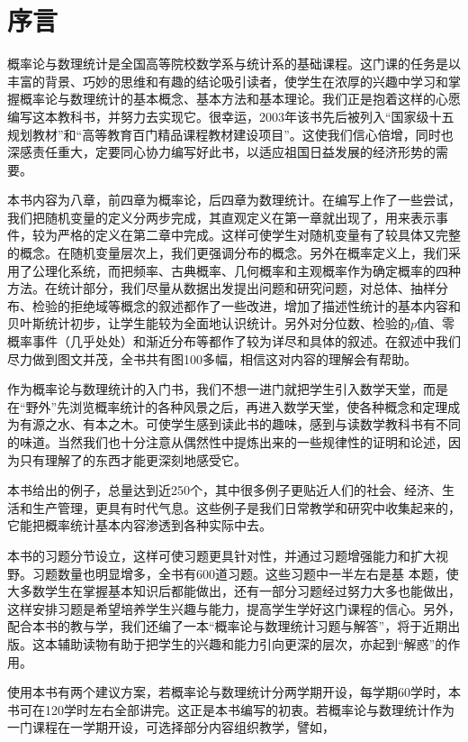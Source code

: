 
\chapter*{序\quad 言}
概率论与数理统计是全国高等院校数学系与统计系的基础课程。这门课的任务是以丰富的背景、巧妙的思维和有趣的结论吸引读者，使学生在浓厚的兴趣中学习和掌握概率论与数理统计的基本概念、基本方法和基本理论。我们正是抱着这样的心愿编写这本教科书，并努力去实现它。很幸运，2003年该书先后被列入“国家级十五规划教材”和“高等教育百门精品课程教材建设项目”。这使我们信心倍增，同时也深感责任重大，定要同心协力编写好此书，以适应祖国日益发展的经济形势的需要。

本书内容为八章，前四章为概率论，后四章为数理统计。在编写上作了一些尝试，我们把随机变量的定义分两步完成，其直观定义在第一章就出现了，用来表示事件，较为严格的定义在第二章中完成。这样可使学生对随机变量有了较具体又完整的概念。在随机变量层次上，我们更强调分布的概念。另外在概率定义上，我们采用了公理化系统，而把频率、古典概率、几何概率和主观概率作为确定概率的四种方法。在统计部分，我们尽量从数据出发提出问题和研究问题，对总体、抽样分布、检验的拒绝域等概念的叙述都作了一些改进，增加了描述性统计的基本内容和贝叶斯统计初步，让学生能较为全面地认识统计。另外对分位数、检验的$p$值、零概率事件（几乎处处）和渐近分布等都作了较为详尽和具体的叙述。在叙述中我们尽力做到图文并茂，全书共有图100多幅，相信这对内容的理解会有帮助。

作为概率论与数理统计的入门书，我们不想一进门就把学生引入数学天堂，而是在“野外”先浏览概率统计的各种风景之后，再进入数学天堂，使各种概念和定理成为有源之水、有本之木。可使学生感到读此书的趣味，感到与读数学教科书有不同的味道。当然我们也十分注意从偶然性中提炼出来的一些规律性的证明和论述，因为只有理解了的东西才能更深刻地感受它。

本书给出的例子，总量达到近250个，其中很多例子更贴近人们的社会、经济、生活和生产管理，更具有时代气息。这些例子是我们日常教学和研究中收集起来的，它能把概率统计基本内容渗透到各种实际中去。

本书的习题分节设立，这样可使习题更具针对性，并通过习题增强能力和扩大视野。习题数量也明显增多，全书有600道习题。这些习题中一半左右是基
本题，使大多数学生在掌握基本知识后都能做出，还有一部分习题经过努力大多也能做出，这样安排习题是希望培养学生兴趣与能力，提高学生学好这门课程的信心。另外，配合本书的教与学，我们还编了一本“概率论与数理统计习题与解答”，将于近期出版。这本辅助读物有助于把学生的兴趣和能力引向更深的层次，亦起到“解惑”的作用。

使用本书有两个建议方案，若概率论与数理统计分两学期开设，每学期60学时，本书可在120学时左右全部讲完。这正是本书编写的初衷。若概率论与数理统计作为一门课程在一学期开设，可选择部分内容组织教学，譬如，

